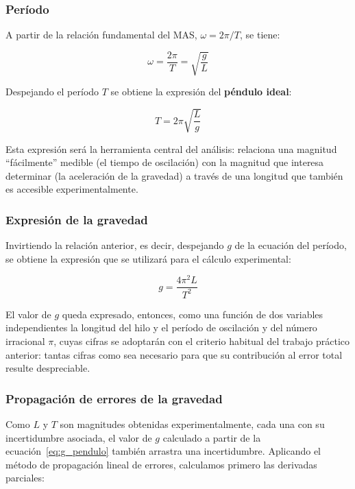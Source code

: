 \subsubsection{Período}

A partir de la relación fundamental del MAS, $\omega = 2\pi/T$, se tiene:

\begin{equation}
    \omega = \frac{2\pi}{T} = \sqrt{\frac{g}{L}}
\end{equation}

Despejando el período $T$ se obtiene la expresión del \textbf{péndulo ideal}:

\begin{equation}
    T = 2\pi\sqrt{\frac{L}{g}}
\end{equation}

Esta expresión será la herramienta central del análisis: relaciona una magnitud ``fácilmente'' medible (el tiempo de oscilación) con la magnitud que interesa determinar (la aceleración de la gravedad) a través de una longitud que también es accesible experimentalmente.

\subsubsection{Expresión de la gravedad}

Invirtiendo la relación anterior, es decir, despejando $g$ de la ecuación del período, se obtiene la expresión que se utilizará para el cálculo experimental:

\begin{equation}
    g = \frac{4\pi^2 L}{T^2}
    \label{eq:g_pendulo}
\end{equation}

El valor de $g$ queda expresado, entonces, como una función de dos variables independientes la longitud del hilo y el período de oscilación y del número irracional $\pi$, cuyas cifras se adoptarán con el criterio habitual del trabajo práctico anterior: tantas cifras como sea necesario para que su contribución al error total resulte despreciable.

\subsubsection{Propagación de errores de la gravedad}

Como $L$ y $T$ son magnitudes obtenidas experimentalmente, cada una con su incertidumbre asociada, el valor de $g$ calculado a partir de la ecuación~\ref{eq:g_pendulo} también arrastra una incertidumbre. Aplicando el método de propagación lineal de errores, calculamos primero las derivadas parciales:

